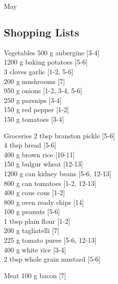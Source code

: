 \begin{menu}{May}
    \subsection*{Shopping Lists}
      \begin{shoppinglist}{Vegetables}
      500 g aubergine {\scriptsize[3-4]}\\
      1200 g baking potatoes {\scriptsize[5-6]}\\
      3 cloves garlic {\scriptsize[1-2, 5-6]}\\
      200 g mushrooms {\scriptsize[7]}\\
      950 g onions {\scriptsize[1-2, 3-4, 5-6]}\\
      250 g parsnips {\scriptsize[3-4]}\\
      150 g red pepper {\scriptsize[1-2]}\\
      150 g tomatoes {\scriptsize[3-4]}\\
      \end{shoppinglist}%
      \begin{shoppinglist}{Groceries}
      2 tbsp branston pickle {\scriptsize[5-6]}\\
      4 tbsp bread {\scriptsize[5-6]}\\
      400 g brown rice {\scriptsize[10-11]}\\
      150 g bulgur wheat {\scriptsize[12-13]}\\
      1200 g can kidney beans {\scriptsize[5-6, 12-13]}\\
      800 g can tomatoes {\scriptsize[1-2, 12-13]}\\
      400 g cous cous {\scriptsize[1-2]}\\
      800 g oven ready chips {\scriptsize[14]}\\
      100 g peanuts {\scriptsize[5-6]}\\
      1 tbsp plain flour {\scriptsize[1-2]}\\
      200 g tagliatelli {\scriptsize[7]}\\
      225 g tomato puree {\scriptsize[5-6, 12-13]}\\
      400 g white rice {\scriptsize[3-4]}\\
      2 tbsp whole grain mustard {\scriptsize[5-6]}\\
      \end{shoppinglist}%
      \par\vfil %
      \begin{shoppinglist}{Meat}
      100 g bacon {\scriptsize[7]}\\

\end{shoppinglist}
\end{menu}
